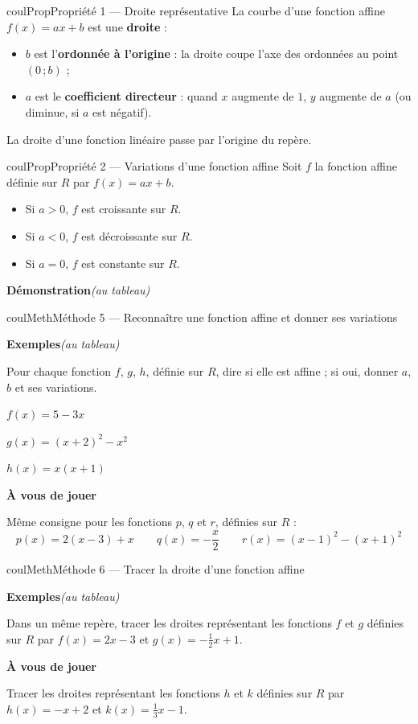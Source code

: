 \documentclass[11pt,a4paper]{article}
\makeatletter
\newcommand{\R}{\mathbb{R}}
\newcommand{\N}{\mathbb{N}}
\newcommand{\Z}{\mathbb{Z}}
\newcommand{\Q}{\mathbb{Q}}
\newcommand{\vect}[1]{\overrightarrow{#1}}
\newcommand{\fois}[1]{\times{\color{coulExo}#1}}
\providecommand{\Cf}{\mathcal{C}\sb{f}}%
\providecommand{\Cg}{\mathcal{C}\sb{g}}%
\newcounter{lycee@signet}
\newcommand{\signet}[3][]{\stepcounter{lycee@signet}%
  \edef\lycee@dest{\if\relax\detokenize{#1}\relax
    signet.\arabic{lycee@signet}\else#1\fi}%
  \hypertarget{\lycee@dest}{}\bookmark[level=#2,dest=\lycee@dest]{#3}}
\def\R{R}\def\N{N}\def\Z{Z}\def\Q{Q}\def\vect#1{#1}\def\Cf{Cf}\def\Cg{Cg}\def\fois#1{×#1}%
\newcounter{methode}
\newenvironment{proprietebox}[1][Propriété]%
  {\begin{boitecours}[phantom={\signet{2}{#1}}]{coulProp}{#1}}{\end{boitecours}}
\newenvironment{methodebox}[1][Méthode]{\stepcounter{methode}%
  \begin{boitecours}[phantom={\signet[methode-\arabic{methode}]{2}{#1}}]{coulMeth}{#1}}%
  {\end{boitecours}}
\newcommand{\etape}[1]{\par\smallskip\textbf{\color{coulMeth}#1}\par\nobreak\smallskip}
\newcommand{\autableau}{\hfill{\footnotesize\itshape\color{black!45}(au tableau)}}
\newcommand{\etapeexemples}{%
    \par\smallskip\textbf{\color{coulMeth}Exemples}\autableau\par\nobreak\smallskip}
\makeatother
\begin{document}
\begin{proprietebox}[Propriété 1 --- Droite représentative]
La courbe d'une fonction affine $f(x)=ax+b$ est une \textbf{droite} :
\begin{itemize}
  \item $b$ est l'\textbf{ordonnée à l'origine} : la droite coupe l'axe des ordonnées
        au point $(0\,;b)$ ;
  \item $a$ est le \textbf{coefficient directeur} : quand $x$ augmente de $1$, $y$
        augmente de $a$ (ou diminue, si $a$ est négatif).
\end{itemize}
La droite d'une fonction linéaire passe par l'origine du repère.
\end{proprietebox}

\begin{proprietebox}[Propriété 2 --- Variations d'une fonction affine]
Soit $f$ la fonction affine définie sur $\R$ par $f(x)=ax+b$.
\begin{itemize}
  \item Si $a>0$, $f$ est croissante sur $\R$.
  \item Si $a<0$, $f$ est décroissante sur $\R$.
  \item Si $a=0$, $f$ est constante sur $\R$.
\end{itemize}
\end{proprietebox}

\textbf{Démonstration}\autableau

\begin{methodebox}[Méthode 5 --- Reconnaître une fonction affine et donner ses variations]
\etapeexemples
Pour chaque fonction $f$, $g$, $h$, définie sur $\R$, dire si elle est affine ; si oui,
donner $a$, $b$ et ses variations.
\begin{questions}[label=\alph*)]
  \item ${f(x)=5-3x}$
  \item ${g(x)=(x+2)^{2}-x^{2}}$
  \item ${h(x)=x(x+1)}$
\end{questions}

\etape{À vous de jouer}
Même consigne pour les fonctions $p$, $q$ et $r$, définies sur $\R$ :
\[
  p(x)=2(x-3)+x \qquad q(x)=-\frac{x}{2} \qquad r(x)=(x-1)^{2}-(x+1)^{2}
\]

\end{methodebox}

\begin{methodebox}[Méthode 6 --- Tracer la droite d'une fonction affine]
\etapeexemples
Dans un même repère, tracer les droites représentant les fonctions $f$ et $g$ définies
sur $\R$ par ${f(x)=2x-3}$ et ${g(x)=-\frac{1}{2}x+1}$.

\etape{À vous de jouer}
Tracer les droites représentant les fonctions $h$ et $k$ définies sur $\R$ par
${h(x)=-x+2}$ et ${k(x)=\frac{1}{3}x-1}$.

\end{methodebox}
\end{document}
